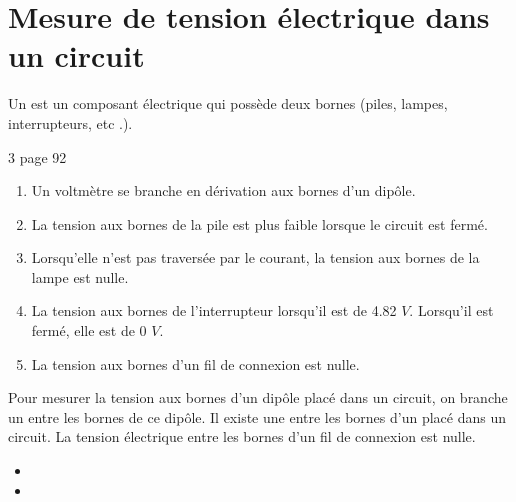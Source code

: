 \documentclass[12pt,a4paper]{article}
\begin{document}
\begin{myexos}
\end{myexos}

\section{Mesure de tension électrique dans un circuit}

\begin{myrap}
	Un  est un composant électrique qui possède deux bornes (piles, lampes, interrupteurs, etc .).
\end{myrap}

\begin{myact}{3 page 92}
	\begin{enumerate}
		\item Un voltmètre se branche en dérivation aux bornes d'un dipôle.
		\item La tension aux bornes de la pile est plus faible lorsque le circuit est fermé.
		\item Lorsqu'elle n'est pas traversée par le courant, la tension aux bornes de la lampe est nulle.
		\item La tension aux bornes de l'interrupteur lorsqu'il est de \num{4.82} $V$. Lorsqu'il est fermé, elle est de \num{0} $V$.
		\item La tension aux bornes d'un fil de connexion est nulle.
	\end{enumerate}
\end{myact}

\begin{mybilan}
	Pour mesurer la tension aux bornes d'un dipôle placé dans un circuit, on branche un  entre les bornes de ce dipôle. Il existe une  entre les bornes d'un  placé dans un circuit.
	La tension électrique entre les bornes d'un fil de connexion est nulle.
\end{mybilan}

\begin{myexos}
	\begin{multicols}{2}
	
		\begin{itemize}
			\item {}
			\item {}
			
		\end{itemize}
	
	\end{multicols}
\end{myexos}
\end{document}
